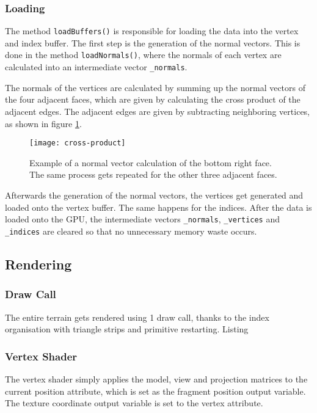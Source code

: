\subsubsection{Loading}
The method \texttt{loadBuffers()} is responsible for loading the data into the vertex and index buffer.
The first step is the generation of the normal vectors. This is done in the method \texttt{loadNormals()},
where the normals of each vertex are calculated into an intermediate vector \texttt{\_normals}.

The normals of the vertices are calculated by summing up the normal vectors 
of the four adjacent faces, which are given by calculating the cross product 
of the adjacent edges. The adjacent edges are given by subtracting 
neighboring vertices, as shown in figure \ref{fig:cross}.

\begin{figure}[H]
  \centering
  \texttt{[image: cross-product]}
  \caption{Example of a normal vector calculation of the bottom right face. The same process gets repeated for the other three adjacent faces.}\label{fig:cross}
\end{figure}

Afterwards the generation of the normal vectors, the vertices get 
generated and loaded onto the vertex buffer. The same happens for the indices.
After the data is loaded onto the GPU, the intermediate 
vectors \texttt{\_normals}, \texttt{\_vertices} and \texttt{\_indices} are cleared so that no unnecessary memory waste occurs.

\subsection{Rendering}
\subsubsection{Draw Call}
The entire terrain gets rendered using 1 draw call,
thanks to the index organisation with triangle strips 
and primitive restarting. Listing 

\subsubsection{Vertex Shader}
The vertex shader simply applies the model, view and projection 
matrices to the current position attribute, which is set as 
the fragment position output variable.
The texture coordinate output variable is set to 
the vertex attribute.

